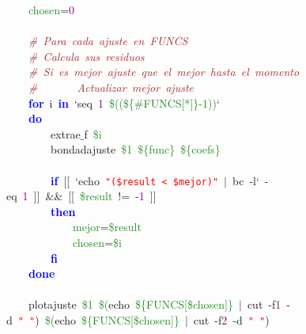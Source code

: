 \mbox{}\ \ \ \ \textcolor{ForestGreen}{chosen}\textcolor{BrickRed}{=}\textcolor{Purple}{0} \\
\mbox{}\ \ \ \  \\
\mbox{}\ \ \ \ \textit{\textcolor{Brown}{\#\ Para\ cada\ ajuste\ en\ FUNCS}} \\
\mbox{}\ \ \ \ \textit{\textcolor{Brown}{\#\ Calcula\ sus\ residuos}} \\
\mbox{}\ \ \ \ \textit{\textcolor{Brown}{\#\ Si\ es\ mejor\ ajuste\ que\ el\ mejor\ hasta\ el\ momento}} \\
\mbox{}\ \ \ \ \textit{\textcolor{Brown}{\#\ \ \ \ \ \ \ Actualizar\ mejor\ ajuste}} \\
\mbox{}\ \ \ \ \textbf{\textcolor{Blue}{for}}\ i\ \textbf{\textcolor{Blue}{in}}\ `seq\ \textcolor{Purple}{1}\ \textcolor{ForestGreen}{\$((\$\{\#FUNCS[*]\}-1))}` \\
\mbox{}\ \ \ \ \textbf{\textcolor{Blue}{do}} \\
\mbox{}\ \ \ \ \ \ \ \ extrae$\_$f\ \textcolor{ForestGreen}{\$i} \\
\mbox{}\ \ \ \ \ \ \ \ bondadajuste\ \textcolor{ForestGreen}{\$1}\ \textcolor{ForestGreen}{\$\{func\}}\ \textcolor{ForestGreen}{\$\{coefs\}} \\
\mbox{}\ \ \ \ \ \ \ \  \\
\mbox{}\ \ \ \ \ \ \ \ \textbf{\textcolor{Blue}{if}}\ \textcolor{BrickRed}{[[}\ `echo\ \texttt{\textcolor{Red}{"{}(\$result\ \textless{}\ \$mejor)"{}}}\ \textcolor{BrickRed}{$|$}\ bc\ -l`\ -eq\ \textcolor{Purple}{1}\ \textcolor{BrickRed}{]]}\ \textcolor{BrickRed}{\&\&}\ \textcolor{BrickRed}{[[}\ \textcolor{ForestGreen}{\$result}\ \textcolor{BrickRed}{!=}\ -\textcolor{Purple}{1}\ \textcolor{BrickRed}{]]} \\
\mbox{}\ \ \ \ \ \ \ \ \textbf{\textcolor{Blue}{then}} \\
\mbox{}\ \ \ \ \ \ \ \ \ \ \ \ \textcolor{ForestGreen}{mejor}\textcolor{BrickRed}{=}\textcolor{ForestGreen}{\$result} \\
\mbox{}\ \ \ \ \ \ \ \ \ \ \ \ \textcolor{ForestGreen}{chosen}\textcolor{BrickRed}{=}\textcolor{ForestGreen}{\$i} \\
\mbox{}\ \ \ \ \ \ \ \ \textbf{\textcolor{Blue}{fi}} \\
\mbox{}\ \ \ \ \textbf{\textcolor{Blue}{done}} \\
\mbox{} \\
\mbox{}\ \ \ \ plotajuste\ \textcolor{ForestGreen}{\$1}\ \textcolor{ForestGreen}{\$(}echo\ \textcolor{ForestGreen}{\$\{FUNCS[\$chosen]\}}\ \textcolor{BrickRed}{$|$}\ cut\ -f\textcolor{Purple}{1}\ -d\ \texttt{\textcolor{Red}{"{}\ "{}}}\textcolor{BrickRed}{)}\ \textcolor{ForestGreen}{\$(}echo\ \textcolor{ForestGreen}{\$\{FUNCS[\$chosen]\}}\ \textcolor{BrickRed}{$|$}\ cut\ -f\textcolor{Purple}{2}\ -d\ \texttt{\textcolor{Red}{"{}\ "{}}}\textcolor{BrickRed}{)} \\
